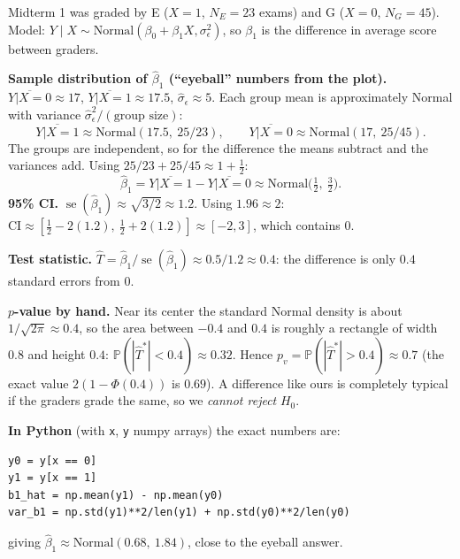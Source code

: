 \documentclass[11pt]{article}
\newcommand{\se}{\operatorname{se}}
\renewcommand{\P}{\mathbb{P}}
\newcommand{\given}{\mid}
\newcommand{\Norm}{\text{Normal}}
\newcommand{\py}[1]{\texttt{#1}}
\begin{document}
\begin{examplebox}[title={Worked example (10/7): do the two midterm graders grade differently?}]
Midterm 1 was graded by E ($X=1$, $N_E=23$ exams) and G ($X=0$, $N_G=45$). Model: $Y\given X\sim\Norm(\beta_0+\beta_1X,\sigma_\epsilon^2)$,
so $\beta_1$ is the difference in average score between graders.

\textbf{Sample distribution of $\hat\beta_1$ (``eyeball'' numbers from the plot).} $\overline{Y|X{=}0}\approx17$,
$\overline{Y|X{=}1}\approx17.5$, $\hat\sigma_\epsilon\approx5$. Each group mean is approximately Normal with variance $\hat\sigma_\epsilon^2/(\text{group size})$:
\[
\overline{Y|X{=}1}\approx\Norm(17.5,\ 25/23),\qquad \overline{Y|X{=}0}\approx\Norm(17,\ 25/45).
\]
The groups are independent, so for the difference the means subtract and the variances add. Using $25/23+25/45\approx1+\tfrac12$:
\[
\hat\beta_1=\overline{Y|X{=}1}-\overline{Y|X{=}0}\approx\Norm\big(\tfrac12,\ \tfrac32\big).
\]
\textbf{95\% CI.} $\se(\hat\beta_1)\approx\sqrt{3/2}\approx1.2$. Using $1.96\approx2$: $\text{CI}\approx[\tfrac12-2(1.2),\ \tfrac12+2(1.2)]\approx[-2,3]$,
which contains $0$.

\textbf{Test statistic.} $\hat T=\hat\beta_1/\se(\hat\beta_1)\approx0.5/1.2\approx0.4$: the difference is only $0.4$ standard errors from $0$.

\textbf{$p$-value by hand.} Near its center the standard Normal density is about $1/\sqrt{2\pi}\approx0.4$, so the area between $-0.4$
and $0.4$ is roughly a rectangle of width $0.8$ and height $0.4$: $\P(|\hat T^*|<0.4)\approx0.32$. Hence $p_v=\P(|\hat T^*|>0.4)\approx0.7$
(the exact value $2(1-\Phi(0.4))$ is $0.69$). A difference like ours is completely typical if the graders grade the same, so we
\emph{cannot reject} $H_0$.

\textbf{In Python} (with \py{x}, \py{y} numpy arrays) the exact numbers are:
\begin{lstlisting}
y0 = y[x == 0]
y1 = y[x == 1]
b1_hat = np.mean(y1) - np.mean(y0)
var_b1 = np.std(y1)**2/len(y1) + np.std(y0)**2/len(y0)
\end{lstlisting}
giving $\hat\beta_1\approx\Norm(0.68,\ 1.84)$, close to the eyeball answer.
\end{examplebox}
\end{document}
